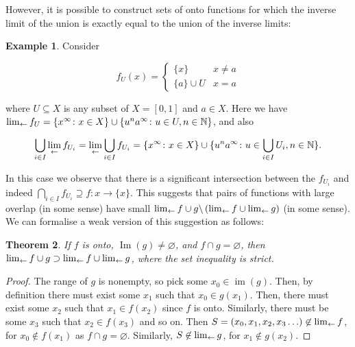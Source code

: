 \documentclass{article}
\newtheorem{thm}{Theorem}
\theoremstyle{definition}
\newtheorem{exam}[thm]{Example}
\let\emptyset\varnothing
\begin{document}
However, it is possible to construct sets of onto functions for which
the inverse limit of the union is exactly equal to the union of the
inverse limits:

\begin{exam}
Consider

\begin{equation}
  f_U(x) = \begin{cases}
    \lbrace x\rbrace & x\neq a\\
    \lbrace a\rbrace\cup U & x=a
  \end{cases}
\end{equation}

where $U\subseteq X$ is any subset of $X=[0,1]$ and $a\in X$.  Here we
have $\lim_{\leftarrow} f_U=\lbrace x^\infty\colon x\in X\rbrace\cup\lbrace
u^na^\infty\colon u\in U, n\in\mathbb{N}\rbrace$, and also

\begin{equation}
  \bigcup_{i\in I}\lim_{\leftarrow} f_{U_i}=
  \lim_{\leftarrow} \bigcup_{i\in I}f_{U_i}=
  \lbrace x^\infty\colon x\in X\rbrace\cup\lbrace
  u^na^\infty\colon u\in\bigcup_{i\in I}U_i, n\in\mathbb{N}\rbrace.
\end{equation}
\end{exam}

In this case we observe that there is a significant intersection
between the $f_{U_i}$ and indeed $\bigcap_{i\in I}f_{U_i}\supseteq
f\colon x\longrightarrow\lbrace x\rbrace$.  This suggests that pairs
of functions with large overlap (in some sense) have small
$\lim_{\leftarrow} f\cup g\backslash\left(\lim_{\leftarrow} f\cup\lim_{\leftarrow} g\right)$ (in
some sense).  We can formalise a weak version of this suggestion as
follows:

\begin{thm}
If $f$ is onto, $\operatorname{Im}(g)\neq\emptyset$, and $f\cap
g=\emptyset$, then  $\lim_{\leftarrow} f\cup g\supset\lim_{\leftarrow} f\cup\lim_{\leftarrow} g$,
where the set inequality is strict.
\end{thm}

\begin{proof}
The range of $g$ is nonempty, so pick some
$x_0\in\operatorname{im}(g)$.  Then, by definition there must exist
some $x_1$ such that $x_0 \in g(x_1)$.  Then, there must exist some
$x_2$ such that $x_1\in f(x_2)$ since $f$ is onto.  Similarly, there
must be some $x_3$ such that $x_2\in f(x_3)$ and so on.  Then $S=(x_0,
x_1, x_2, x_3\ldots)\not\in\lim_{\leftarrow} f$, for $x_0\not\in f(x_1)$ as
$f\cap g=\emptyset$.  Similarly, $S\not\in\lim_{\leftarrow} g$, for $x_1\not\in
g(x_2)$.
\end{proof}
\end{document}
